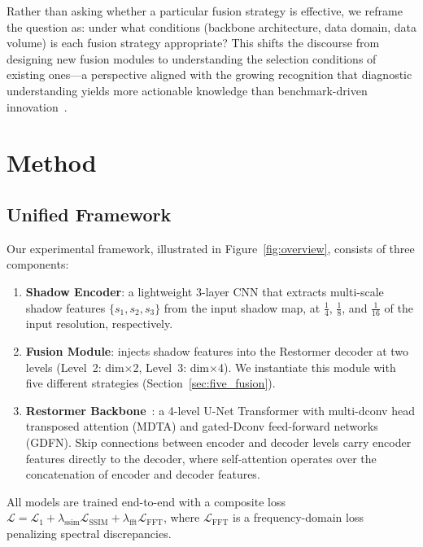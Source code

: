 \documentclass[pdflatex,sn-basic,Numbered]{sn-jnl}
\theoremstyle{thmstyleone}
\theoremstyle{thmstyletwo}
\theoremstyle{thmstylethree}
\begin{document}
Rather than asking whether a particular fusion strategy is effective, we reframe the question as: under what conditions (backbone architecture, data domain, data volume) is each fusion strategy appropriate?
This shifts the discourse from designing new fusion modules to understanding the selection conditions of existing ones---a perspective aligned with the growing recognition that diagnostic understanding yields more actionable knowledge than benchmark-driven innovation~\cite{zhou2026feature}.

\section{Method}\label{sec:method}

\subsection{Unified Framework}

Our experimental framework, illustrated in Figure~\ref{fig:overview}, consists of three components:

\begin{enumerate}
  \item \textbf{Shadow Encoder}: a lightweight 3-layer CNN that extracts multi-scale shadow features $\{s_1, s_2, s_3\}$ from the input shadow map, at $\frac{1}{4}$, $\frac{1}{8}$, and $\frac{1}{16}$ of the input resolution, respectively.
  \item \textbf{Fusion Module}: injects shadow features into the Restormer decoder at two levels (Level~2: dim$\times$2, Level~3: dim$\times$4). We instantiate this module with five different strategies (Section~\ref{sec:five_fusion}).
  \item \textbf{Restormer Backbone}~\cite{zamir2022restormer}: a 4-level U-Net Transformer with multi-dconv head transposed attention (MDTA) and gated-Dconv feed-forward networks (GDFN). Skip connections between encoder and decoder levels carry encoder features directly to the decoder, where self-attention operates over the concatenation of encoder and decoder features.
\end{enumerate}

All models are trained end-to-end with a composite loss $\mathcal{L} = \mathcal{L}_1 + \lambda_{\text{ssim}}\mathcal{L}_{\text{SSIM}} + \lambda_{\text{fft}}\mathcal{L}_{\text{FFT}}$, where $\mathcal{L}_{\text{FFT}}$ is a frequency-domain loss penalizing spectral discrepancies.
\end{document}

